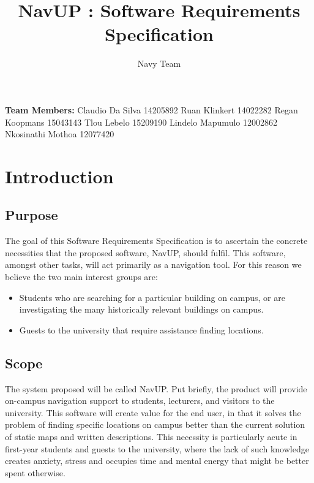 \documentclass[12pt,a4paper]{article}
\author{Navy Team}
\title{NavUP : Software Requirements Specification}
\begin{document}
	\maketitle
	\bigskip
	\begin{flushright}
	 \textbf{Team Members: }\newline
	 Claudio Da Silva 14205892\newline
	 Ruan Klinkert 14022282\newline
	 Regan Koopmans 15043143\newline
	 Tlou Lebelo 15209190\newline
	 Lindelo Mapumulo 12002862\newline
	 Nkosinathi Mothoa 12077420\newline
    \end{flushright}

	\pagebreak
	\tableofcontents
	\pagebreak


	\section{Introduction}

		\subsection{Purpose}

		The goal of this Software Requirements Specification is to ascertain the
		concrete necessities that the proposed software, NavUP, should fulfil. This
		software, amongst other tasks, will act primarily as a navigation tool. For
		this reason we believe the two main interest groups are:

		\begin{itemize}
			\item Students who are searching for a particular building on campus, or are
						investigating the many historically relevant buildings on campus.

			\item Guests to the university that require assistance finding locations.
		\end{itemize}


		\subsection{Scope}

			The system proposed will be called NavUP. Put briefly, the product will
			provide on-campus navigation support to students, lecturers, and visitors to
			the university. This software will create value for the end user, in that
			it solves the problem of finding specific locations on campus better than
			the current solution of static maps and written descriptions. This
			necessity is particularly acute in first-year students and guests to the
			university, where the lack of such knowledge creates anxiety, stress and
			occupies time and mental energy that might be better spent otherwise.
\end{document}
